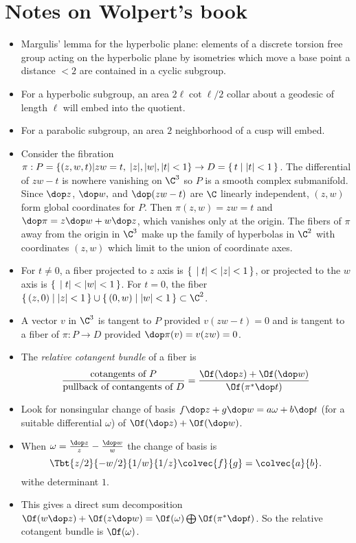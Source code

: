 \documentclass[11pt]{amsart}
\begin{document}
\section{Notes on Wolpert's book}
\begin{itemize}
  \item Margulis' lemma for the hyperbolic plane: elements of a discrete torsion free group acting on the hyperbolic plane by isometries which move a base point a distance $<2$ are contained in a cyclic subgroup. 
  \item For a hyperbolic subgroup, an area $2 \ell \cot \ell/2$ collar about a geodesic of length $\ell$ will embed into the quotient.
  \item For a parabolic subgroup, an area $2$ neighborhood of a cusp will embed. 
  \item Consider the fibration $\pi:P= \{ (z,w,t)| zw=t, \; |z|,|w|,|t| <1\} \to D = \set{ t | |t|<1}$. The differential of $zw-t$ is nowhere vanishing on $\C^3$ so $P$ is a smooth complex submanifold. Since $\dop z$, $\dop w,$ and $\dop(zw-t)$ are $\C$ linearly independent, $(z,w)$ form global coordinates for $P$. Then $\pi(z,w)=zw=t$ and $\dop \pi = z \dop w+ w \dop z$, which vanishes only at the origin. The fibers of $\pi$ away from the origin in $\C^3$ make up the family of hyperbolas in $\C^2$ with coordinates $(z,w)$ which limit to the union of coordinate axes. 
  \item For $t \neq 0$, a fiber projected to $z$ axis is $\set{ |t|<|z|<1}$, or projected to the $w$ axis is $\set{ |t|<|w|<1}$. For $t=0$, the fiber $\set{ (z,0) | |z|<1} \cup \set{(0,w) | |w|<1}\subset \C^2$. 
  \item A vector $v$ in $\C^3$ is tangent to $P$ provided $v(zw-t)=0$ and is tangent to a fiber of $\pi: P\to D$ provided $ \dop \pi (v)=v(zw)=0$.
  \item The \emph{relative cotangent bundle} of a fiber is \[ \frac{\text{cotangents of }P}{\text{pullback of contangents of } D} = \frac{ \Of(\dop z) + \Of(\dop w) }{ \Of ( \pi^* \dop t)} \]
  \item Look for nonsingular change of basis $f \dop z + g \dop w = a \omega +b \dop t$ (for a suitable differential $\omega$) of $\Of(\dop z) + \Of(\dop w) $. 
  \item When $\omega = \frac{\dop z}{z} - \frac{\dop w}{w}$ the change of basis is \[ \Tbt{z/2}{-w/2}{1/w}{1/z} \colvec{f}{g} = \colvec{a}{b}. \] withe determinant $1$. 
  \item This gives a direct sum decomposition $\Of(w \dop z) +\Of( z \dop w) = \Of(\omega) \bigoplus \Of(\pi^* \dop t)$. So the relative cotangent bundle is $\Of(\omega)$. 

\end{itemize}
\end{document}
